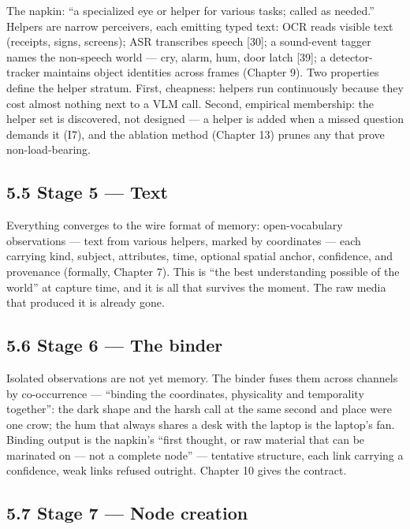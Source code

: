The napkin: ``a specialized eye or helper for various tasks; called as needed.'' Helpers are narrow perceivers, each emitting typed text: OCR reads visible text (receipts, signs, screens); ASR transcribes speech {[}30{]}; a sound-event tagger names the non-speech world --- cry, alarm, hum, door latch {[}39{]}; a detector-tracker maintains object identities across frames (Chapter 9). Two properties define the helper stratum. First, cheapness: helpers run continuously because they cost almost nothing next to a VLM call. Second, empirical membership: the helper set is discovered, not designed --- a helper is added when a missed question demands it (I7), and the ablation method (Chapter 13) prunes any that prove non-load-bearing.

\subsection{5.5 Stage 5 --- Text}\label{stage-5-text}

Everything converges to the wire format of memory: open-vocabulary observations --- text from various helpers, marked by coordinates --- each carrying kind, subject, attributes, time, optional spatial anchor, confidence, and provenance (formally, Chapter 7). This is ``the best understanding possible of the world'' at capture time, and it is all that survives the moment. The raw media that produced it is already gone.

\subsection{5.6 Stage 6 --- The binder}\label{stage-6-the-binder}

Isolated observations are not yet memory. The binder fuses them across channels by co-occurrence --- ``binding the coordinates, physicality and temporality together'': the dark shape and the harsh call at the same second and place were one crow; the hum that always shares a desk with the laptop is the laptop's fan. Binding output is the napkin's ``first thought, or raw material that can be marinated on --- not a complete node'' --- tentative structure, each link carrying a confidence, weak links refused outright. Chapter 10 gives the contract.

\subsection{5.7 Stage 7 --- Node creation}\label{stage-7-node-creation}

